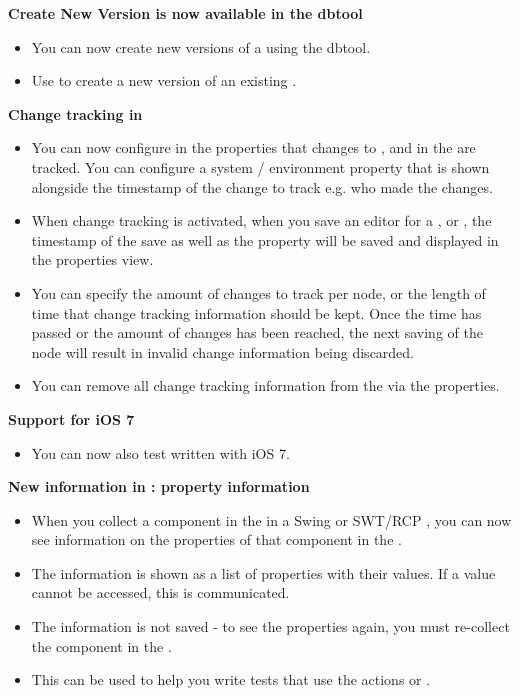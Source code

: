 \textbf{Create New Version is now available in the dbtool}
\begin{itemize}
\item You can now create new versions of a \gdproject{} using the dbtool.
\item Use  to create a new version of an existing \gdproject{}.
\end{itemize}

\textbf{Change tracking in \gdprojects{}}
\begin{itemize}
\item You can now configure in the \gdproject{} properties that changes to \gdcases{}, \gdsuites{} and \gdjobs{} in the \gdproject{} are tracked. You can configure a system / environment property that is shown alongside the timestamp of the change to track e.g. who made the changes. 
\item When change tracking is activated, when you save an editor for a \gdcase{}, \gdsuite{} or \gdjob{}, the timestamp of the save as well as the property will be saved and displayed in the properties view.
\item You can specify the amount of changes to track per node, or the length of time that change tracking information should be kept. Once the time has passed or the amount of changes has been reached, the next saving of the node will result in invalid change information being discarded.
\item You can remove all change tracking information from the \gdproject{} via the \gdproject{} properties. 
\end{itemize}

\textbf{Support for iOS 7}
\begin{itemize}
\item You can now also test \gdauts{} written with iOS 7.
\end{itemize}

\textbf{New information in \gdomm{} : property information}
\begin{itemize}
\item When you collect a component in the \gdomm{} in a Swing or SWT/RCP \gdaut{}, you can now see information on the properties of that component in the \gdpropview{}.
\item The information is shown as a list of properties with their values. If a value cannot be accessed, this is communicated.
\item The information is not saved - to see the properties again, you must re-collect the component in the \gdomm{}.
\item This can be used to help you write tests that use the actions  or .
\end{itemize}


